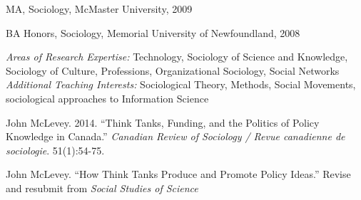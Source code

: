 \documentclass[11pt,usenames,dvipsnames]{article}
\begin{document}

\noindent MA, Sociology, McMaster University, 2009

\noindent BA Honors, Sociology, Memorial University of Newfoundland, 2008 \\



\noindent \emph{Areas of Research Expertise:} Technology, Sociology of Science and Knowledge, Sociology of Culture, Professions, Organizational Sociology, Social Networks \\

\noindent \emph{Additional Teaching Interests:} Sociological Theory, Methods, Social Movements, sociological approaches to Information Science \\




\ind John McLevey. 2014. ``Think Tanks, Funding, and the Politics of Policy Knowledge in Canada.'' \emph{Canadian Review of Sociology / Revue canadienne de sociologie}. 51(1):54-75.\\



\ind John McLevey. ``How Think Tanks Produce and Promote Policy Ideas.'' Revise and resubmit from \emph{Social Studies of Science} \\

\end{document}
